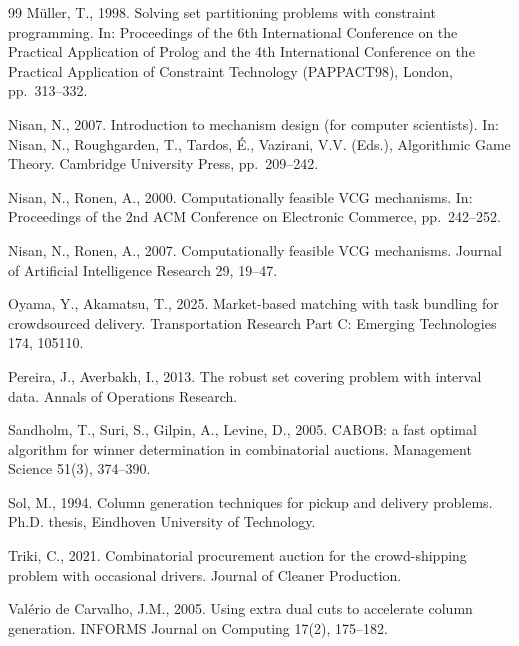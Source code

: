 \documentclass[review,12pt]{elsarticle}
\theoremstyle{definition}
\theoremstyle{remark}
\begin{document}
\begin{thebibliography}{99}
M{\"u}ller, T., 1998. Solving set partitioning problems with constraint
programming. In: Proceedings of the 6th International Conference on the
Practical Application of Prolog and the 4th International Conference on the
Practical Application of Constraint Technology (PAPPACT98), London,
pp.~313--332. %

Nisan, N., 2007. Introduction to mechanism design (for computer scientists).
In: Nisan, N., Roughgarden, T., Tardos, {\'E}., Vazirani, V.V. (Eds.),
Algorithmic Game Theory. Cambridge University Press, pp.~209--242.

Nisan, N., Ronen, A., 2000. Computationally feasible VCG mechanisms. In:
Proceedings of the 2nd ACM Conference on Electronic Commerce, pp.~242--252.

Nisan, N., Ronen, A., 2007. Computationally feasible VCG mechanisms. Journal
of Artificial Intelligence Research 29, 19--47. %

Oyama, Y., Akamatsu, T., 2025. Market-based matching with task bundling for
crowdsourced delivery. Transportation Research Part C: Emerging Technologies
174, 105110. %

Pereira, J., Averbakh, I., 2013. The robust set covering problem with
interval data. Annals of Operations Research. %

Sandholm, T., Suri, S., Gilpin, A., Levine, D., 2005. CABOB: a fast optimal
algorithm for winner determination in combinatorial auctions. Management
Science 51(3), 374--390.

Sol, M., 1994. Column generation techniques for pickup and delivery
problems. Ph.D. thesis, Eindhoven University of Technology.

Triki, C., 2021. Combinatorial procurement auction for the crowd-shipping
problem with occasional drivers. Journal of Cleaner Production.

Val{\'e}rio de Carvalho, J.M., 2005. Using extra dual cuts to accelerate
column generation. INFORMS Journal on Computing 17(2), 175--182.


\end{thebibliography}
\end{document}
